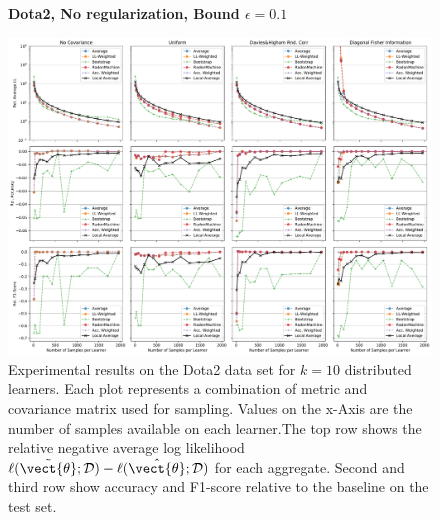 \begin{landscape}
    \begin{figure}
        \centering
        \textbf{Dota2, No regularization, Bound $\epsilon=0.1$}\par\medskip
        \includegraphics[height=\dimexpr \textheight - 4\baselineskip\relax]{kapitel/figures/dota2_None_0.1_neg_relative.pdf}
        \caption[Dota2 plots without regularization and $\epsilon=0.1$]{Experimental results on the Dota2 data set for $k=10$ distributed learners. Each plot represents a combination of metric and covariance matrix used for sampling. Values on the x-Axis are the number of samples available on each learner.The top row shows the relative negative average log likelihood $\ell(\tilde{\vect{\theta}}; \mathcal{D}) - \ell(\hat{\vect{\theta}}; \mathcal{D})$ for each aggregate. Second and third row show accuracy and F1-score relative to the baseline on the test set.}
        \label{fig:analysis10}
    \end{figure}
    \end{landscape}
